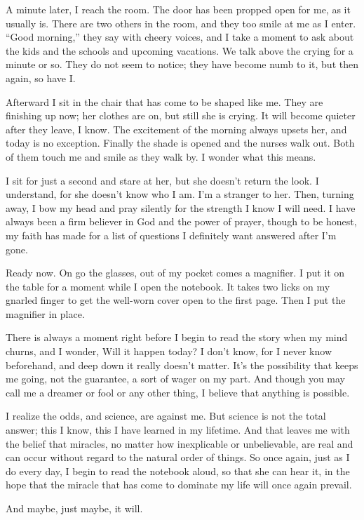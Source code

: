 \documentclass[10pt, twoside, openright]{book}
\begin{document}
A minute later, I reach the room. The door has been propped open for me,
as it usually is. There are two others in the room, and they too smile
at me as I enter. ``Good morning,'' they say with cheery voices, and I
take a moment to ask about the kids and the schools and upcoming
vacations. We talk above the crying for a minute or so. They do not seem
to notice; they have become numb to it, but then again, so have I.

Afterward I sit in the chair that has come to be shaped like me. They
are finishing up now; her clothes are on, but still she is crying. It
will become quieter after they leave, I know. The excitement of the
morning always upsets her, and today is no exception. Finally the shade
is opened and the nurses walk out. Both of them touch me and smile as
they walk by. I wonder what this means.

I sit for just a second and stare at her, but she doesn't return the
look. I understand, for she doesn't know who I am. I'm a stranger to
her. Then, turning away, I bow my head and pray silently for the
strength I know I will need. I have always been a firm believer in God
and the power of prayer, though to be honest, my faith has made for a
list of questions I definitely want answered after I'm gone.

Ready now. On go the glasses, out of my pocket comes a magnifier. I put
it on the table for a moment while I open the notebook. It takes two
licks on my gnarled finger to get the well-worn cover open to the first
page. Then I put the magnifier in place.

There is always a moment right before I begin to read the story when my
mind churns, and I wonder, Will it happen today? I don't know, for I
never know beforehand, and deep down it really doesn't matter. It's the
possibility that keeps me going, not the guarantee, a sort of wager on
my part. And though you may call me a dreamer or fool or any other
thing, I believe that anything is possible.

I realize the odds, and science, are against me. But science is not the
total answer; this I know, this I have learned in my lifetime. And that
leaves me with the belief that miracles, no matter how inexplicable or
unbelievable, are real and can occur without regard to the natural order
of things. So once again, just as I do every day, I begin to read the
notebook aloud, so that she can hear it, in the hope that the miracle
that has come to dominate my life will once again prevail.


And maybe, just maybe, it will.
\end{document}
